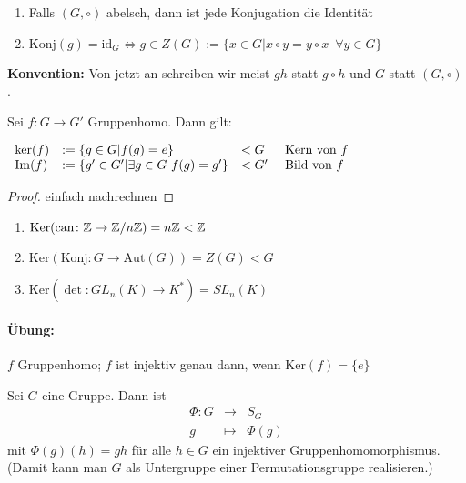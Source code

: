 \documentclass[12pt,a4paper]{scrartcl}
\begin{document}
\begin{bem}
	\leavevmode
	\begin{enumerate}
		\item 	Falls $(G,\circ)$ abelsch, dann ist jede Konjugation die Identität
		\item $\text{Konj}(g) = \text{id}_G \Leftrightarrow g\in Z(G):=\{x\in G|x\circ y = y\circ x\enspace \forall y\in G\}$
	\end{enumerate}
\end{bem}

\textbf{Konvention:} Von jetzt an schreiben wir meist $gh$ statt $g\circ h$ und $G$ statt $(G,\circ)$.

\begin{satz}
	Sei $f\colon G\to G'$ Gruppenhomo. Dann gilt:

\vspace{2mm}	
$	\begin{array}{llll}
		\operatorname{ker}(f) & := \{g\in G|f(g) = e\}                       & <G & \mbox{ Kern von }f\\
		\operatorname{Im}(f)  & := \{g'\in G'|\exists g\in G\ f(g)=g'\} & <G' & \text{ Bild von }f
	\end{array}$
\end{satz}

\begin{proof}
	einfach nachrechnen
\end{proof}
\begin{bsp}
	\leavevmode
	\begin{enumerate}
		\item $\mbox{Ker}(\text{can}\colon \mathbb Z\to \mathbb Z/n\mathbb Z) = n\mathbb Z<\mathbb Z$
		\item $\mbox{Ker}(\text{Konj}\colon G\to \text{Aut}(G)) = Z(G)<G$
		\item $\mbox{Ker}(\det\colon GL_n(K)\to K^*) = SL_n(K)$
	\end{enumerate}
\end{bsp}

\paragraph{Übung:} $f$ Gruppenhomo; $f$ ist injektiv genau dann, wenn $\text{Ker}(f) = \{e\}$

\begin{satz}
	Sei $G$ eine Gruppe. Dann ist
	\begin{eqnarray*}
		\Phi \colon G&\to& S_G\\
		g&\mapsto& \Phi(g)
	\end{eqnarray*} mit $\Phi(g)(h) = gh$ für alle $h\in G$ ein injektiver Gruppenhomomorphismus. (Damit kann man $G$ als Untergruppe einer Permutationsgruppe \glqq realisieren\grqq.)
\end{satz}
\end{document}
